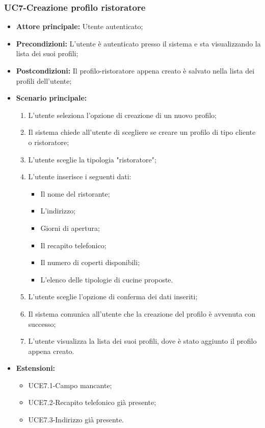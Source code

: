 \subsubsection{UC7-Creazione profilo ristoratore}
\begin{itemize}
    \item \textbf{Attore principale:} Utente autenticato;
    \item \textbf{Precondizioni:} L'utente è autenticato presso il sistema e sta visualizzando la lista dei suoi profili;
    \item \textbf{Postcondizioni:} Il profilo-ristoratore appena creato è salvato nella lista dei profili dell'utente;
    \item \textbf{Scenario principale:}
    \begin{enumerate}
        \item L'utente seleziona l'opzione di creazione di un nuovo profilo;
        \item Il sistema chiede all'utente di scegliere se creare un profilo di tipo cliente o ristoratore;
        \item L'utente sceglie la tipologia "ristoratore";
        \item L'utente inserisce i seguenti dati:
        \begin{itemize}
            \item Il nome del ristorante;
            \item L'indirizzo;
            \item Giorni di apertura;
            \item Il recapito telefonico;
            \item Il numero di coperti disponibili;
            \item L'elenco delle tipologie di cucine proposte.
        \end{itemize}
        \item L'utente sceglie l'opzione di conferma dei dati inseriti;
        \item Il sistema comunica all'utente che la creazione del profilo è avvenuta con successo;
        \item L'utente visualizza la lista dei suoi profili, dove è stato aggiunto il profilo appena creato.
    \end{enumerate}
        \item \textbf{Estensioni:}
        \begin{itemize}
                \item UCE7.1-Campo mancante;
                \item UCE7.2-Recapito telefonico già presente;
                \item UCE7.3-Indirizzo già presente.
        \end{itemize}
\end{itemize}

